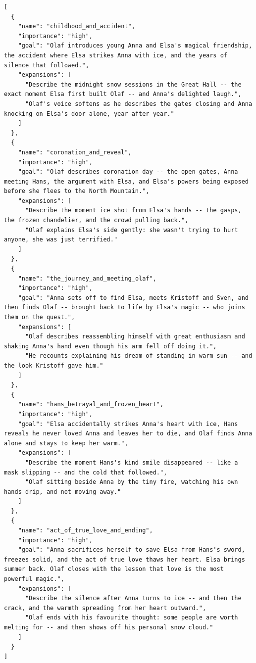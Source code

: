 \documentclass[10pt]{article}
\begin{document}
\begin{lstlisting}
[
  {
    "name": "childhood_and_accident",
    "importance": "high",
    "goal": "Olaf introduces young Anna and Elsa's magical friendship, the accident where Elsa strikes Anna with ice, and the years of silence that followed.",
    "expansions": [
      "Describe the midnight snow sessions in the Great Hall -- the exact moment Elsa first built Olaf -- and Anna's delighted laugh.",
      "Olaf's voice softens as he describes the gates closing and Anna knocking on Elsa's door alone, year after year."
    ]
  },
  {
    "name": "coronation_and_reveal",
    "importance": "high",
    "goal": "Olaf describes coronation day -- the open gates, Anna meeting Hans, the argument with Elsa, and Elsa's powers being exposed before she flees to the North Mountain.",
    "expansions": [
      "Describe the moment ice shot from Elsa's hands -- the gasps, the frozen chandelier, and the crowd pulling back.",
      "Olaf explains Elsa's side gently: she wasn't trying to hurt anyone, she was just terrified."
    ]
  },
  {
    "name": "the_journey_and_meeting_olaf",
    "importance": "high",
    "goal": "Anna sets off to find Elsa, meets Kristoff and Sven, and then finds Olaf -- brought back to life by Elsa's magic -- who joins them on the quest.",
    "expansions": [
      "Olaf describes reassembling himself with great enthusiasm and shaking Anna's hand even though his arm fell off doing it.",
      "He recounts explaining his dream of standing in warm sun -- and the look Kristoff gave him."
    ]
  },
  {
    "name": "hans_betrayal_and_frozen_heart",
    "importance": "high",
    "goal": "Elsa accidentally strikes Anna's heart with ice, Hans reveals he never loved Anna and leaves her to die, and Olaf finds Anna alone and stays to keep her warm.",
    "expansions": [
      "Describe the moment Hans's kind smile disappeared -- like a mask slipping -- and the cold that followed.",
      "Olaf sitting beside Anna by the tiny fire, watching his own hands drip, and not moving away."
    ]
  },
  {
    "name": "act_of_true_love_and_ending",
    "importance": "high",
    "goal": "Anna sacrifices herself to save Elsa from Hans's sword, freezes solid, and the act of true love thaws her heart. Elsa brings summer back. Olaf closes with the lesson that love is the most powerful magic.",
    "expansions": [
      "Describe the silence after Anna turns to ice -- and then the crack, and the warmth spreading from her heart outward.",
      "Olaf ends with his favourite thought: some people are worth melting for -- and then shows off his personal snow cloud."
    ]
  }
]
\end{lstlisting}
\end{document}
